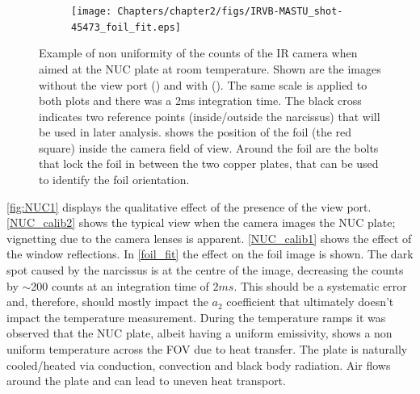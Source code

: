 \begin{figure}[!ht]
\begin{subfigure}{0.535\linewidth}
         \caption{}
         \label{NUC_calib1}
     \end{subfigure}
     \begin{subfigure}{0.7\linewidth}
         \centering
         \texttt{[image: Chapters/chapter2/figs/IRVB-MASTU\_shot-45473\_foil\_fit.eps]}
         \caption{}
         \label{foil_fit}
     \end{subfigure}
    \caption{Example of non uniformity of the counts of the IR camera when aimed at the NUC plate at room temperature. Shown are the images without the view port () and with (). The same scale is applied to both plots and there was a 2ms integration time. The black cross indicates two reference points (inside/outside the narcissus) that will be used in later analysis.  shows the position of the foil (the red square) inside the camera field of view. Around the foil are the bolts that lock the foil in between the two copper plates, that can be used to identify the foil orientation.}
    \label{fig:NUC1}
\end{figure}

\autoref{fig:NUC1} displays the qualitative effect of the presence of the view port. \autoref{NUC_calib2} shows the typical view when the camera images the NUC plate; vignetting due to the camera lenses is apparent. \autoref{NUC_calib1} shows the effect of the window reflections. In \autoref{foil_fit} the effect on the foil image is shown. The dark spot caused by the narcissus is at the centre of the image, decreasing the counts by $\sim$200 counts at an integration time of $2ms$. This should be a systematic error and, therefore, should mostly impact the $a_2$ coefficient that ultimately doesn't impact the temperature measurement.
During the temperature ramps it was observed that the NUC plate, albeit having a uniform emissivity, shows a non uniform temperature across the FOV due to heat transfer. The plate is naturally cooled/heated via conduction, convection and black body radiation. Air flows around the plate and can lead to uneven heat transport.

